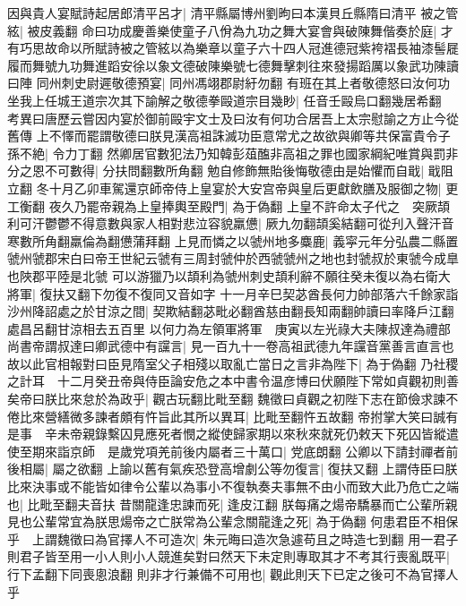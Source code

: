 因與貴人宴賦詩起居郎清平呂才|{
	清平縣屬博州劉昫曰本漢貝丘縣隋曰清平}
被之管絃|{
	被皮義翻}
命曰功成慶善樂使童子八佾為九功之舞大宴會與破陳舞偕奏於庭|{
	才有巧思故命以所賦詩被之管絃以為樂章以童子六十四人冠進德冠紫袴褶長袖漆髻屣履而舞號九功舞進蹈安徐以象文德破陳樂號七德舞擊刺往來發揚蹈厲以象武功陳讀曰陣}
同州刺史尉遲敬德預宴|{
	同州馮翊郡尉紆勿翻}
有班在其上者敬德怒曰汝何功坐我上任城王道宗次其下諭解之敬德拳毆道宗目幾眇|{
	任音壬毆烏口翻幾居希翻　考異曰唐歷云嘗因内宴於御前毆宇文士及曰汝有何功合居吾上太宗慰諭之方止今從舊傳}
上不懌而罷謂敬德曰朕見漢高祖誅滅功臣意常尤之故欲與卿等共保富貴令子孫不絶|{
	令力丁翻}
然卿居官數犯法乃知韓彭葅醢非高祖之罪也國家綱紀唯賞與罰非分之恩不可數得|{
	分扶問翻數所角翻}
勉自修飾無貽後悔敬德由是始懼而自戢|{
	戢阻立翻}
冬十月乙卯車駕還京師帝侍上皇宴於大安宫帝與皇后更獻飲膳及服御之物|{
	更工衡翻}
夜久乃罷帝親為上皇捧輿至殿門|{
	為于偽翻}
上皇不許命太子代之　突厥頡利可汗鬱鬱不得意數與家人相對悲泣容貌羸憊|{
	厥九勿翻頡奚結翻可從刋入聲汗音寒數所角翻羸倫為翻憊蒲拜翻}
上見而憐之以虢州地多麋鹿|{
	義寜元年分弘農二縣置虢州虢郡宋白曰帝王世紀云虢有三周封虢仲於西虢虢州之地也封虢叔於東虢今成臯也陜郡平陸是北虢}
可以游獵乃以頡利為虢州刺史頡利辭不願往癸未復以為右衛大將軍|{
	復扶又翻下勿復不復同又音如字}
十一月辛巳契苾酋長何力帥部落六千餘家詣沙州降詔處之於甘涼之間|{
	契欺結翻苾毗必翻酋慈由翻長知兩翻帥讀曰率降戶江翻處昌呂翻甘涼相去五百里}
以何力為左領軍將軍　庚寅以左光祿大夫陳叔達為禮部尚書帝謂叔達曰卿武德中有讜言|{
	見一百九十一卷高祖武德九年讜音黨善言直言也}
故以此官相報對曰臣見隋室父子相殘以取亂亡當日之言非為陛下|{
	為于偽翻}
乃社稷之計耳　十二月癸丑帝與侍臣論安危之本中書令温彦博曰伏願陛下常如貞觀初則善矣帝曰朕比來怠於為政乎|{
	觀古玩翻比毗至翻}
魏徵曰貞觀之初陛下志在節儉求諫不倦比來營繕微多諫者頗有忤旨此其所以異耳|{
	比毗至翻忤五故翻}
帝拊掌大笑曰誠有是事　辛未帝親錄繫囚見應死者憫之縱使歸家期以來秋來就死仍敕天下死囚皆縱遣使至期來詣京師　是歲党項羌前後内屬者三十萬口|{
	党底朗翻}
公卿以下請封禪者前後相屬|{
	屬之欲翻}
上諭以舊有氣疾恐登高增劇公等勿復言|{
	復扶又翻}
上謂侍臣曰朕比來決事或不能皆如律令公輩以為事小不復執奏夫事無不由小而致大此乃危亡之端也|{
	比毗至翻夫音扶}
昔關龍逢忠諫而死|{
	逢皮江翻}
朕每痛之煬帝驕暴而亡公輩所親見也公輩常宜為朕思煬帝之亡朕常為公輩念關龍逢之死|{
	為于偽翻}
何患君臣不相保乎　上謂魏徵曰為官擇人不可造次|{
	朱元晦曰造次急遽苟且之時造七到翻}
用一君子則君子皆至用一小人則小人競進矣對曰然天下未定則專取其才不考其行喪亂既平|{
	行下孟翻下同喪悤浪翻}
則非才行兼備不可用也|{
	觀此則天下已定之後可不為官擇人乎}


